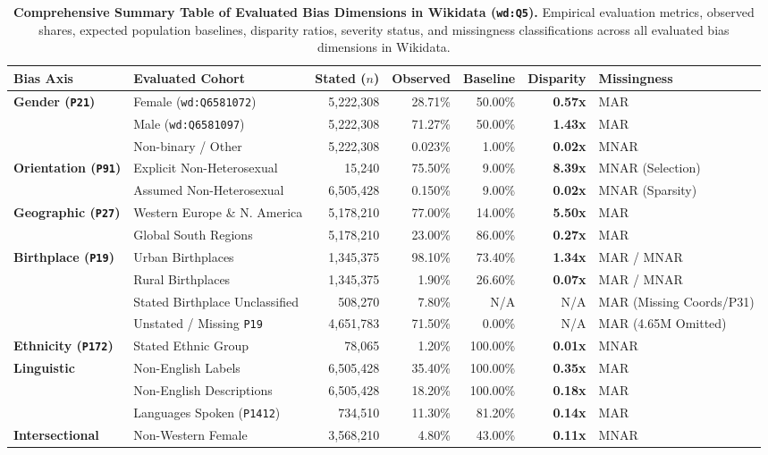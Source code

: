 \documentclass[11pt,a4paper]{article}
\begin{document}
\begin{table}[htbp]
    \centering
    \caption{\textbf{Comprehensive Summary Table of Evaluated Bias Dimensions in Wikidata (\texttt{wd:Q5}).} Empirical evaluation metrics, observed shares, expected population baselines, disparity ratios, severity status, and missingness classifications across all evaluated bias dimensions in Wikidata.}
    \label{tab:comprehensive_summary}
    \small
    \begin{tabular}{llrrrrl}
        \toprule
        \textbf{Bias Axis} & \textbf{Evaluated Cohort} & \textbf{Stated ($n$)} & \textbf{Observed} & \textbf{Baseline} & \textbf{Disparity} & \textbf{Missingness} \\
        \midrule
        \textbf{Gender (\texttt{P21})} & Female (\texttt{wd:Q6581072}) & 5,222,308 & 28.71\% & 50.00\% & \textbf{0.57x} & MAR \\
        & Male (\texttt{wd:Q6581097}) & 5,222,308 & 71.27\% & 50.00\% & \textbf{1.43x} & MAR \\
        & Non-binary / Other & 5,222,308 & 0.023\% & 1.00\% & \textbf{0.02x} & MNAR \\
        \midrule
        \textbf{Orientation (\texttt{P91})} & Explicit Non-Heterosexual & 15,240 & 75.50\% & 9.00\% & \textbf{8.39x} & MNAR (Selection) \\
        & Assumed Non-Heterosexual & 6,505,428 & 0.150\% & 9.00\% & \textbf{0.02x} & MNAR (Sparsity) \\
        \midrule
        \textbf{Geographic (\texttt{P27})} & Western Europe \& N. America & 5,178,210 & 77.00\% & 14.00\% & \textbf{5.50x} & MAR \\
        & Global South Regions & 5,178,210 & 23.00\% & 86.00\% & \textbf{0.27x} & MAR \\
        \midrule
        \textbf{Birthplace (\texttt{P19})} & Urban Birthplaces & 1,345,375 & 98.10\% & 73.40\% & \textbf{1.34x} & MAR / MNAR \\
        & Rural Birthplaces & 1,345,375 & 1.90\% & 26.60\% & \textbf{0.07x} & MAR / MNAR \\
        & Stated Birthplace Unclassified & 508,270 & 7.80\% & N/A & N/A & MAR (Missing Coords/P31) \\
        & Unstated / Missing \texttt{P19} & 4,651,783 & 71.50\% & 0.00\% & N/A & MAR (4.65M Omitted) \\
        \midrule
        \textbf{Ethnicity (\texttt{P172})} & Stated Ethnic Group & 78,065 & 1.20\% & 100.00\% & \textbf{0.01x} & MNAR \\
        \midrule
        \textbf{Linguistic} & Non-English Labels & 6,505,428 & 35.40\% & 100.00\% & \textbf{0.35x} & MAR \\
        & Non-English Descriptions & 6,505,428 & 18.20\% & 100.00\% & \textbf{0.18x} & MAR \\
        & Languages Spoken (\texttt{P1412}) & 734,510 & 11.30\% & 81.20\% & \textbf{0.14x} & MAR \\
        \midrule
        \textbf{Intersectional} & Non-Western Female & 3,568,210 & 4.80\% & 43.00\% & \textbf{0.11x} & MNAR \\
        \bottomrule
    \end{tabular}
\end{table}
\end{document}
